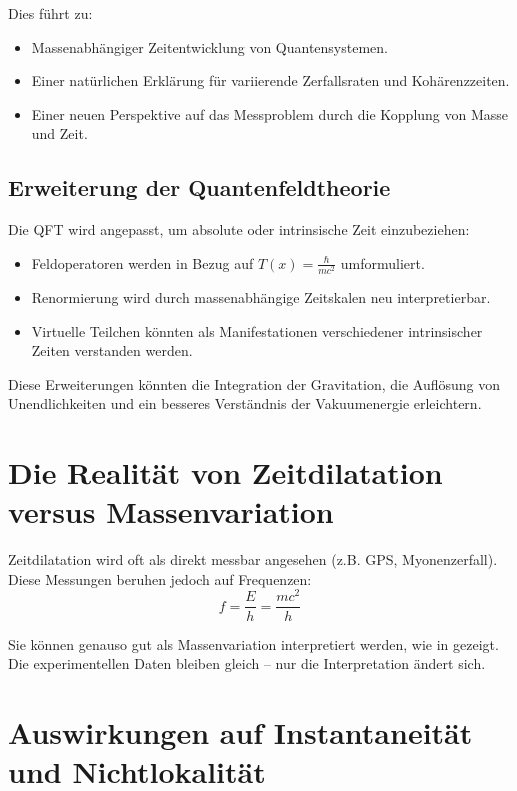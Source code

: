 \documentclass[a4paper,12pt]{article}
\newcommand{\Tfield}{T(x)}
\begin{document}
	Dies führt zu:
	\begin{itemize}
		\item Massenabhängiger Zeitentwicklung von Quantensystemen.
		\item Einer natürlichen Erklärung für variierende Zerfallsraten und Kohärenzzeiten.
		\item Einer neuen Perspektive auf das Messproblem durch die Kopplung von Masse und Zeit.
	\end{itemize}
	
	\subsection{Erweiterung der Quantenfeldtheorie}
	
	Die QFT wird angepasst, um absolute oder intrinsische Zeit einzubeziehen:
	\begin{itemize}
		\item Feldoperatoren werden in Bezug auf \(\Tfield = \frac{\hbar}{m c^2}\) umformuliert.
		\item Renormierung wird durch massenabhängige Zeitskalen neu interpretierbar.
		\item Virtuelle Teilchen könnten als Manifestationen verschiedener intrinsischer Zeiten verstanden werden.
	\end{itemize}
	
	Diese Erweiterungen könnten die Integration der Gravitation, die Auflösung von Unendlichkeiten und ein besseres Verständnis der Vakuumenergie erleichtern.
	
	\section{Die Realität von Zeitdilatation versus Massenvariation}
	
	Zeitdilatation wird oft als direkt messbar angesehen (z.B. GPS, Myonenzerfall). Diese Messungen beruhen jedoch auf Frequenzen:
	\begin{equation}
		f = \frac{E}{h} = \frac{m c^2}{h}
	\end{equation}
	
	Sie können genauso gut als Massenvariation interpretiert werden, wie in \cite{pascher_planck_2025} gezeigt. Die experimentellen Daten bleiben gleich – nur die Interpretation ändert sich.
	
	\section{Auswirkungen auf Instantaneität und Nichtlokalität}
	
\end{document}
